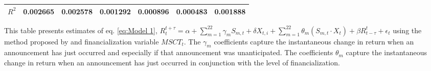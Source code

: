 \begin{sidewaystable}
{\begin{tabular}{@{}lllllllllllll@{}}
                        \\ \textbf{$R^2$}             &\multicolumn{2}{c}{ 0.002665 }                                                 & \multicolumn{2}{c}{ 0.002578 }                                                 & \multicolumn{2}{c}{ 0.001292 }                                                 & \multicolumn{2}{c}{ 0.000896 }                                                 & \multicolumn{2}{c}{ 0.000483 }                                                   & \multicolumn{2}{c}{ 0.001888 }                                                 \\ \bottomrule 
\end{tabular}
}
\begin{tablenotes}\item 
    \singlespacing
    \footnotesize
    This table presents estimates of eq. \ref{eq:Model 1}, $R_{t}^{t+\tau}=\alpha+\sum_{m=1}^{22} \gamma_m S_{m,t}+ \delta X_{t,i} + \sum_{m=1}^{22} \theta_m (S_{m,t} \cdot X_t)+\beta R_{t-\tau}^{t}+\epsilon_{t}$ using the method proposed by \citet{kurov2019price} and financialization variable $MSCT_t$. The $\gamma_m$ coefficients capture the instantaneous change in return when an announcement has just occurred and especially if that announcement was unanticipated. The coefficients $\theta_m$ capture the instantaneous change in return when an announcement has just occurred in conjunction with the level of financialization.
\end{tablenotes}
\end{sidewaystable}

